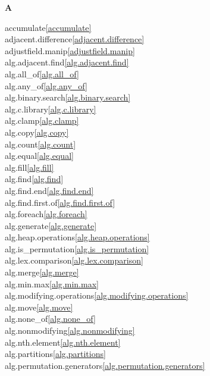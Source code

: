 \begin{multicols}{2}


\par \textbf{A}\par
accumulate\quad\ref{accumulate}\\
adjacent.difference\quad\ref{adjacent.difference}\\
adjustfield.manip\quad\ref{adjustfield.manip}\\
alg.adjacent.find\quad\ref{alg.adjacent.find}\\
alg.all_of\quad\ref{alg.all_of}\\
alg.any_of\quad\ref{alg.any_of}\\
alg.binary.search\quad\ref{alg.binary.search}\\
alg.c.library\quad\ref{alg.c.library}\\
alg.clamp\quad\ref{alg.clamp}\\
alg.copy\quad\ref{alg.copy}\\
alg.count\quad\ref{alg.count}\\
alg.equal\quad\ref{alg.equal}\\
alg.fill\quad\ref{alg.fill}\\
alg.find\quad\ref{alg.find}\\
alg.find.end\quad\ref{alg.find.end}\\
alg.find.first.of\quad\ref{alg.find.first.of}\\
alg.foreach\quad\ref{alg.foreach}\\
alg.generate\quad\ref{alg.generate}\\
alg.heap.operations\quad\ref{alg.heap.operations}\\
alg.is_permutation\quad\ref{alg.is_permutation}\\
alg.lex.comparison\quad\ref{alg.lex.comparison}\\
alg.merge\quad\ref{alg.merge}\\
alg.min.max\quad\ref{alg.min.max}\\
alg.modifying.operations\quad\ref{alg.modifying.operations}\\
alg.move\quad\ref{alg.move}\\
alg.none_of\quad\ref{alg.none_of}\\
alg.nonmodifying\quad\ref{alg.nonmodifying}\\
alg.nth.element\quad\ref{alg.nth.element}\\
alg.partitions\quad\ref{alg.partitions}\\
alg.permutation.generators\quad\ref{alg.permutation.generators}\\

\end{multicols}
